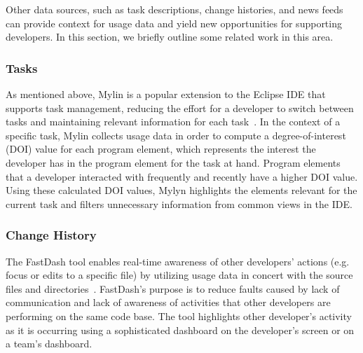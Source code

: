 
Other data sources, such as task descriptions, change histories, and
news feeds can provide context for usage data and yield new opportunities for supporting developers. In this section, we briefly outline some related work in this area.

\subsubsection{Tasks}

As mentioned above, Mylin is a popular extension to the Eclipse IDE that supports task
management, reducing the effort for a developer to switch between
tasks and maintaining relevant information for each
task~\cite{Kersten-Mylin}. In the context of a specific task, Mylin
collects usage data in order to compute a degree-of-interest (DOI)
value for each program element, which represents the interest the
developer has in the program element for the task at hand. Program elements that a developer interacted with frequently and recently have a higher DOI value. Using these calculated DOI values, Mylyn highlights the elements relevant for the current task and filters unnecessary information from common views in the IDE. 

\subsubsection{Change History}

The FastDash tool enables real-time awareness of other developers'
actions (e.g. focus or edits to a specific file) by utilizing usage
data in concert with the source files and
directories~\cite{FastDash}. FastDash's purpose is to reduce faults
caused by lack of communication and lack of awareness of activities
that other developers are performing on the same code base. The tool
highlights other developer's activity as it is occurring using a
sophisticated dashboard on the developer's screen or on a team's dashboard.

